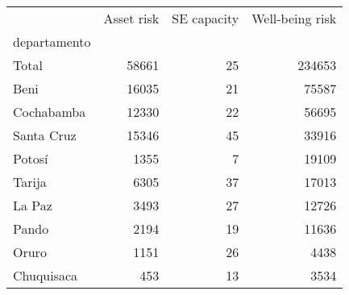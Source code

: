 \begin{tabular}{lrrr}
\toprule
{} &  Asset risk &  SE capacity &  Well-being risk \\
departamento &             &              &                  \\
\midrule
Total        &       58661 &           25 &           234653 \\
Beni         &       16035 &           21 &            75587 \\
Cochabamba   &       12330 &           22 &            56695 \\
Santa Cruz   &       15346 &           45 &            33916 \\
Potosí       &        1355 &            7 &            19109 \\
Tarija       &        6305 &           37 &            17013 \\
La Paz       &        3493 &           27 &            12726 \\
Pando        &        2194 &           19 &            11636 \\
Oruro        &        1151 &           26 &             4438 \\
Chuquisaca   &         453 &           13 &             3534 \\
\bottomrule
\end{tabular}
